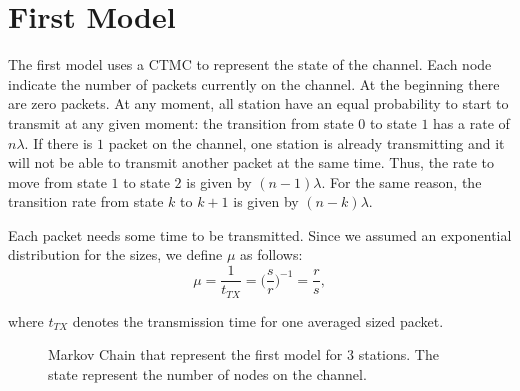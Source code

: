\section{First Model}
\label{sec:first_model}

The first model uses a \ac{CTMC} to represent the state of the channel.
Each node indicate the number of packets currently on the channel.
At the beginning there are zero packets.
At any moment, all station have an equal probability to start to transmit at any given moment: the transition from state $0$ to state $1$ has a rate of $n \lambda$.
If there is $1$ packet on the channel, one station is already transmitting and it will not be able to transmit another packet at the same time.
Thus, the rate to move from state $1$ to state $2$ is given by $(n-1) \lambda$.
For the same reason, the transition rate from state $k$ to $k+1$ is given by $(n - k) \lambda$.

Each packet needs some time to be transmitted.
Since we assumed an exponential distribution for the sizes, we define $\mu$ as follows:
\begin{equation*}
    \mu = \frac{1}{t_{TX}}
    = \Big( \frac{s}{r} \Big) ^ {-1}
    = \frac{r}{s},
\end{equation*}

where $t_{TX}$ denotes the transmission time for one averaged sized packet.

\begin{figure}[t!]
    \centering
    \caption{Markov Chain that represent the first model for $3$ stations. The state represent the number of nodes on the channel.}
    \label{fig:simple}
\end{figure}

